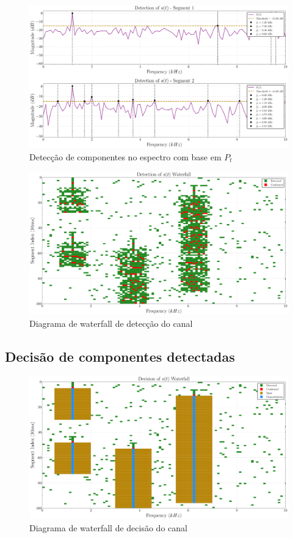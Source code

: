 \begin{figure}[H]
	\centering
	\caption{Detecção de componentes no espectro com base em $P_t$}\label{fig:freq_detection}
	\includegraphics[width=\linewidth]{assets/cap3/example_detector_freq.pdf}
\end{figure}

\begin{figure}[H]
	\centering
	\caption{Diagrama de waterfall de detecção do canal}\label{fig:waterfall_detection}
	\includegraphics[width=\linewidth]{assets/cap3/example_detector_waterfall_detection.pdf}
\end{figure}


\subsection{Decisão de componentes detectadas}\label{sec:decisao}

\begin{figure}[H]
	\centering
	\caption{Diagrama de waterfall de decisão do canal}\label{fig:waterfall_decision}
	\includegraphics[width=\linewidth]{assets/cap3/example_detector_waterfall_decision.pdf}
\end{figure}

